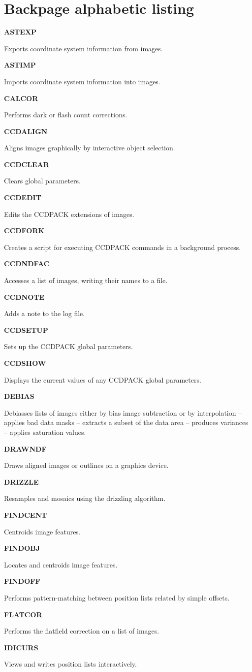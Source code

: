 \documentclass[twoside,11pt]{article}
\newenvironment{latexonly}{}{}
\renewcommand{\_}{\texttt{\symbol{95}}}
\newcommand{\quickdes}[3]{
                         \parbox{1.1in}{\bf #1}
                         \parbox{4.4in}{\raggedright #2 \dotfill}
                         \parbox{0.6in}{\pageref{#3}}
                         \vspace*{0.2in}}
\newcommand{\latexonlysection}[1]{\section{#1}}
\newcommand{\latexonlysection}[1]{#1}
\begin{document}
\begin{latexonly}
\newpage
\latexonlysection{Backpage alphabetic listing}

\quickdes{ASTEXP}{Exports coordinate system information from images.}
         {ASTEXP}

\quickdes{ASTIMP}{Imports coordinate system information into images.}{ASTIMP}

\quickdes{CALCOR}{Performs dark or flash count corrections.}{CALCOR}

\quickdes{CCDALIGN}{Aligns images graphically by interactive object selection.}
         {CCDALIGN}

\quickdes{CCDCLEAR}{Clears global parameters.}
         {CCDCLEAR}

\quickdes{CCDEDIT}{Edits the CCDPACK extensions of images.}
         {CCDEDIT}

\quickdes{CCDFORK}{Creates a script for executing CCDPACK
                   commands in a background process.}{CCDFORK}

\quickdes{CCDNDFAC}{Accesses a list of images, writing their names to a file.}
         {CCDNDFAC}

\quickdes{CCDNOTE}{Adds a note to the log file.}{CCDNOTE}

\quickdes{CCDSETUP}{Sets up the CCDPACK global parameters.}{CCDSETUP}

\quickdes{CCDSHOW}{Displays the current values of any CCDPACK global
                   parameters.}{CCDSHOW}

\quickdes{DEBIAS}{Debiasses lists of images either by bias image
                 subtraction or by interpolation --
                 applies bad data masks --
                 extracts a subset of the data area --
                 produces variances --
                 applies saturation values.}
                 {DEBIAS}

\quickdes{DRAWNDF}{Draws aligned images or outlines on a graphics device.}
                  {DRAWNDF}

\quickdes{DRIZZLE}{Resamples and mosaics using the drizzling algorithm.}
                  {DRIZZLE}

\quickdes{FINDCENT}{Centroids image features.}
                   {FINDCENT}

\quickdes{FINDOBJ}{Locates and centroids image features.}
                  {FINDOBJ}

\quickdes{FINDOFF}{Performs pattern-matching between position lists
                   related by simple offsets.}
                   {FINDOFF}

\quickdes{FLATCOR}{Performs the flatfield correction on a list of images.}
                  {FLATCOR}

\quickdes{IDICURS}{Views and writes position lists interactively.}{IDICURS}

\end{latexonly}
\end{document}
